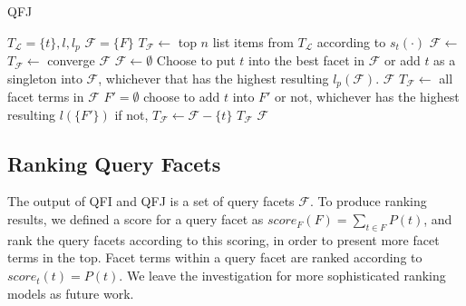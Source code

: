\begin{algorithm}[ht!]
 \caption{QFJ}
\label{alg:qfj}
\begin{algorithmic}[1]
  \Require $T_{\mathcal{L}}=\{t\}, l, l_p$
  \Ensure $\mathcal{F}=\{F\}$
  \State $T_\mathcal{F} \leftarrow$ top $n$ list items from $T_{\mathcal{L}}$ according to $s_t(\cdot)$ 
  \Repeat
  \State $\mathcal{F}\leftarrow$ 
  \State $T_\mathcal{F}\leftarrow$ 
  \Until converge
  \State \Return $\mathcal{F}$
  \State
    \State $\mathcal{F} \leftarrow \emptyset$ 
      \State Choose to put $t$ into the best facet in $\mathcal{F}$ or add $t$ as a singleton into $\mathcal{F}$, whichever that has the highest resulting $l_p(\mathcal{F})$.
    \EndFor 
  \State \Return $\mathcal{F}$
  \EndFunction 
  \State
{}
  \State $T_\mathcal{F}\leftarrow$ all facet terms in $\mathcal{F}$
    \State $F'=\emptyset$
      \State choose to add $t$ into $F'$ or not, whichever has the highest resulting $l(\{F'\})$
      \State if not, $T_\mathcal{F}\leftarrow \mathcal{F} - \{t\}$
    \EndFor
  \EndFor
  \State \Return  $T_\mathcal{F}$
\EndFunction 
  \State \Return $\mathcal{F}$
\end{algorithmic}
\end{algorithm}

\subsection{Ranking Query Facets}
The output of QFI and QFJ is a set of query facets $\mathcal{F}$. To produce ranking results, we defined a score for a query facet as $score_F(F)=\sum_{t \in F}{P(t)}$, and rank the query facets according to this scoring, in order to present more facet terms in the top. Facet terms within a query facet are ranked according to $score_t(t)=P(t)$. We leave the investigation for more sophisticated ranking models as future work.


